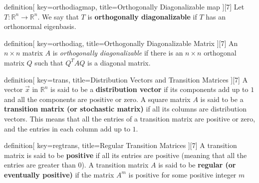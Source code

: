 \begin{SaveConcept}{definition}[
		key=orthodiagmap,
		title={Orthogonally Diagonalizable map}
	][7]
	Let $T:\mathbb R^n\to \mathbb R^n$. We say that $T$ is {\bf orthogonally diagonalizable} if  $T$ has an orthonormal eigenbasis.
\end{SaveConcept}

\begin{SaveConcept}{definition}[
		key=orthodiag,
		title={Orthogonally Diagonalizable Matrix}
	][7]
	An $n\times n$ matrix $A$ is \emph{orthogonally diagonalizable} if there is an $n\times n$ orthogonal matrix $Q$ such that $Q^TAQ$ is a diagonal matrix.
\end{SaveConcept}

\begin{SaveConcept}{definition}[
		key=trans,
		title={Distribution Vectors and Transition Matrices}
	][7]
	A vector $\vec x$  in $\mathbb R^n$ is said to be a \textbf{distribution vector} if its components add up to $1$
and all the components are positive or zero.
A square matrix $A$ is said to be a \textbf{transition matrix (or stochastic matrix)} if all
its columns are distribution vectors. This means that all the entries of a transition
matrix are positive or zero, and the entries in each column add up to $1$.
\end{SaveConcept}


\begin{SaveConcept}{definition}[
		key=regtrans,
		title={Regular Transition Matrices}
	][7]
A transition matrix is said to be \textbf{positive} if all its entries are positive (meaning
that all the entries are greater than 0).
A transition matrix $A$ is said to be \textbf{regular (or eventually positive)} if the matrix $A^m$ is positive for some positive integer $m$
\end{SaveConcept}

